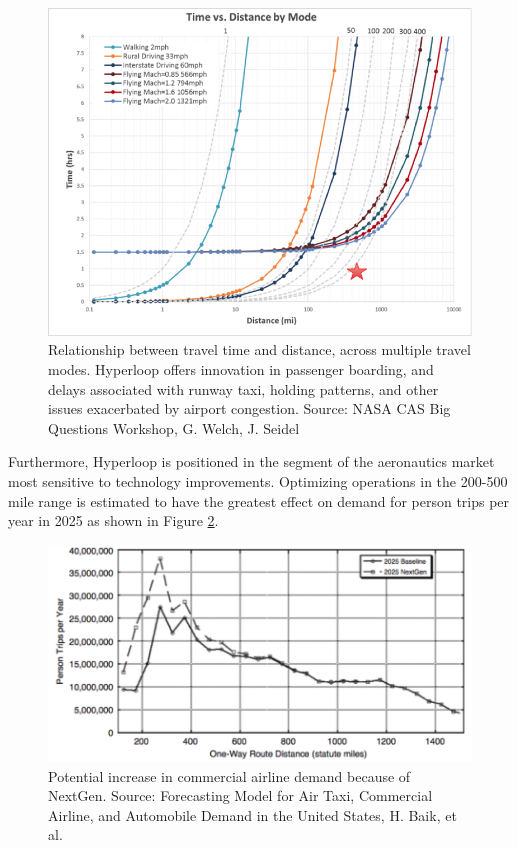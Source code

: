 \documentclass[heading.tex]{subfiles}
\begin{document}
	\begin{figure}[hbtp]
		\centering
		\includegraphics[width=.75\textwidth]{images/Seidel.png}
		\caption[Time]{Relationship between travel time and distance, across multiple travel modes. Hyperloop offers innovation in passenger boarding, and delays associated with runway taxi, holding patterns, and other issues exacerbated by airport congestion. Source: NASA CAS Big Questions Workshop, G. Welch, J. Seidel}
		\label{f:time}
	\end{figure}

	Furthermore, Hyperloop is positioned in the segment of the aeronautics market most sensitive to technology improvements. Optimizing operations in the 200-500 mile range is estimated to have the greatest effect on demand for person trips per year in 2025 as shown in Figure \ref{f:demand}.

	\begin{figure}[hbtp]
		\centering
		\includegraphics[width=.75\textwidth]{images/demand.png}
		\caption[demand]{Potential increase in commercial airline demand because of NextGen. Source: Forecasting Model for Air Taxi, Commercial Airline, and Automobile Demand in the United States, H. Baik, et al.}
		\label{f:demand}
	\end{figure}
\end{document}
